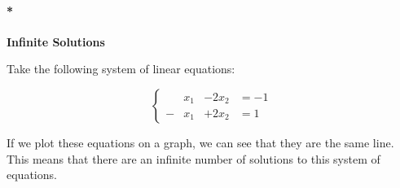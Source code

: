 \documentclass[
  letterpaper,
  DIV=11,
  numbers=noendperiod]{scrreprt}
\let\oldparagraph\paragraph
\renewcommand{\paragraph}[1]{\oldparagraph{#1}\mbox{}}
\begin{document}
\hypertarget{infinite-solutions}{%
\paragraph*{\texorpdfstring{\textbf{Infinite
Solutions}}{Infinite Solutions}}\label{infinite-solutions}}

Take the following system of linear equations:

\[
\begin{cases}
&x_1 &- 2x_2 &= -1\\
-&x_1 &+ 2x_2 &= 1
\end{cases}
\]

If we plot these equations on a graph, we can see that they are the same
line. This means that there are an infinite number of solutions to this
system of equations.
\end{document}
